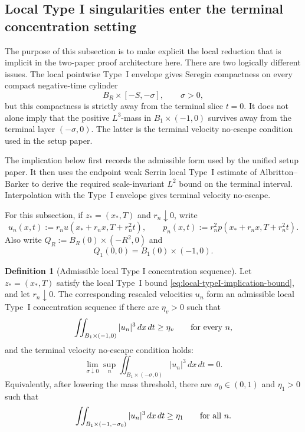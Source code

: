 \documentclass[11pt]{amsart}
\numberwithin{equation}{section}
\theoremstyle{plain}
\theoremstyle{definition}
\newtheorem{definition}[definition]{Definition}
\theoremstyle{remark}
\begin{document}
\subsection{Local Type I singularities enter the terminal concentration setting}
\label{sec:local-typeI-implication}

The purpose of this subsection is to make explicit the local reduction that is
implicit in the two-paper proof architecture here.  There are two logically
different issues.  The local pointwise Type~I envelope gives Seregin compactness
on every compact negative-time cylinder
\[
   B_R\times[-S,-\sigma],\qquad \sigma>0,
\]
but this compactness is strictly away from the terminal slice \(t=0\).  It does
not alone imply that the positive \(L^3\)-mass in
\(B_1\times(-1,0)\) survives away from the terminal layer
\((- \sigma,0)\).  The latter is the terminal velocity no-escape
condition used in the setup paper.

The implication below first records the admissible form used by the unified setup
paper.  It then uses the endpoint weak Serrin local Type~I estimate of
Albritton--Barker to derive the required scale-invariant \(L^2\) bound on the
terminal interval.  Interpolation with the Type~I envelope gives terminal
velocity no-escape.

For this subsection, if \(z_*=(x_*,T)\) and \(r_n\downarrow0\), write
\[
   u_n(x,t):=r_nu(x_*+r_nx,T+r_n^2t),
   \qquad
   p_n(x,t):=r_n^2p(x_*+r_nx,T+r_n^2t).
\]
Also write \(Q_R:=B_R(0)\times(-R^2,0)\) and
\[
   Q_1(0,0)=B_1(0)\times(-1,0).
\]

\begin{definition}[Admissible local Type I concentration sequence]
\label{def:admissible-local-typeI-sequence}
Let \(z_*=(x_*,T)\) satisfy the local Type~I bound
\eqref{eq:local-typeI-implication-bound}, and let \(r_n\downarrow0\).  The
corresponding rescaled velocities \(u_n\) form an admissible local Type~I
concentration sequence if there are \(\eta_v>0\) such that
\begin{equation}\label{eq:admissible-local-typeI-positive-mass}
   \iint_{B_1\times(-1,0)} |u_n|^3\,dx\,dt\ge\eta_v
   \qquad\hbox{for every }n,
\end{equation}
and the terminal velocity no-escape condition holds:
\begin{equation}\label{eq:admissible-local-typeI-no-escape}
   \lim_{\sigma\downarrow0}
   \sup_n
   \iint_{B_1\times(-\sigma,0)} |u_n|^3\,dx\,dt=0 .
\end{equation}
Equivalently, after lowering the mass threshold, there are
\(\sigma_0\in(0,1)\) and \(\eta_1>0\) such that
\begin{equation}\label{eq:admissible-local-typeI-away-mass}
   \iint_{B_1\times(-1,-\sigma_0)} |u_n|^3\,dx\,dt\ge\eta_1
   \qquad\hbox{for all }n .
\end{equation}
\end{definition}
\end{document}
